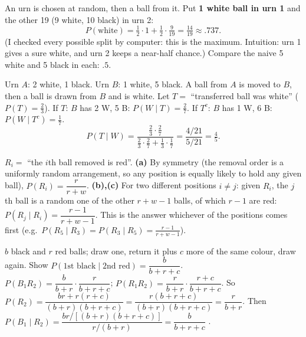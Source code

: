 \documentclass[11pt]{article}
\begin{document}
\begin{exbox}
An urn is chosen at random, then a ball from it. Put \textbf{1 white ball in urn 1} and the other 19 (9 white, 10 black) in urn 2:
\[ P(\text{white})=\tfrac12\cdot1+\tfrac12\cdot\tfrac9{19}=\tfrac{14}{19}\approx\boxed{.737}. \]
(I checked every possible split by computer: this is the maximum. Intuition: urn 1 gives a sure white, and urn 2 keeps a near-half chance.) Compare the naive 5 white and 5 black in each: $.5$.
\end{exbox}

\begin{exbox}
Urn $A$: 2 white, 1 black. Urn $B$: 1 white, 5 black. A ball from $A$ is moved to $B$, then a ball is drawn from $B$ and is white. Let $T=$ ``transferred ball was white'' ($P(T)=\tfrac23$). If $T$: $B$ has 2 W, 5 B: $P(W\mid T)=\tfrac27$. If $T^c$: $B$ has 1 W, 6 B: $P(W\mid T^c)=\tfrac17$.
\[ P(T\mid W)=\frac{\frac23\cdot\frac27}{\frac23\cdot\frac27+\frac13\cdot\frac17}=\frac{4/21}{5/21}=\boxed{\tfrac45}. \]
\end{exbox}

\begin{exbox}
$R_i=$ ``the $i$th ball removed is red''. \textbf{(a)} By symmetry (the removal order is a uniformly random arrangement, so any position is equally likely to hold any given ball), $P(R_i)=\dfrac r{r+w}$. \textbf{(b),(c)} For two different positions $i\neq j$: given $R_i$, the $j$th ball is a random one of the other $r+w-1$ balls, of which $r-1$ are red: $P(R_j\mid R_i)=\dfrac{r-1}{r+w-1}$. This is the answer whichever of the positions comes first (e.g.\ $P(R_5\mid R_3)=P(R_3\mid R_5)=\frac{r-1}{r+w-1}$).
\end{exbox}

\begin{exbox}
$b$ black and $r$ red balls; draw one, return it plus $c$ more of the same colour, draw again. Show $P(\text{1st black}\mid\text{2nd red})=\dfrac b{b+r+c}$.\\
$P(B_1R_2)=\dfrac b{b+r}\cdot\dfrac r{b+r+c}$; $P(R_1R_2)=\dfrac r{b+r}\cdot\dfrac{r+c}{b+r+c}$. So $P(R_2)=\dfrac{br+r(r+c)}{(b+r)(b+r+c)}=\dfrac{r(b+r+c)}{(b+r)(b+r+c)}=\dfrac r{b+r}$. Then $P(B_1\mid R_2)=\dfrac{br/[(b+r)(b+r+c)]}{r/(b+r)}=\dfrac b{b+r+c}$ \checkmark.
\end{exbox}
\end{document}
